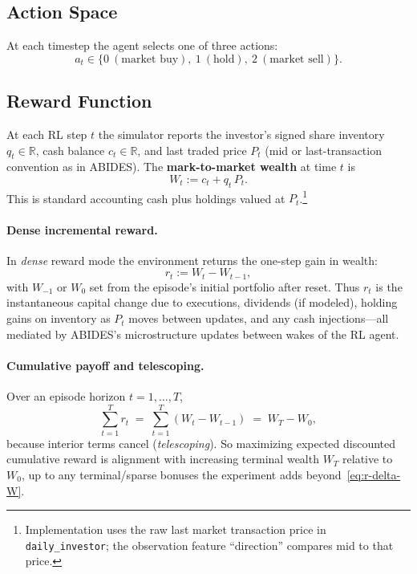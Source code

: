 \documentclass[11pt]{article}
\begin{document}
\subsection{Action Space}

At each timestep the agent selects one of three actions:
\[
a_t \in \{0\ (\text{market buy}),\ 1\ (\text{hold}),\ 2\ (\text{market sell})\}.
\]

\subsection{Reward Function}

At each RL step $t$ the simulator reports the investor's signed share inventory $q_t \in \mathbb{R}$, cash
balance $c_t \in \mathbb{R}$, and last traded price $P_t$ (mid or last-transaction convention as in ABIDES). The
\textbf{mark-to-market wealth} at time $t$ is
\begin{equation}
W_t := c_t + q_t\, P_t.
\label{eq:m2m}
\end{equation}
This is standard accounting cash plus holdings valued at $P_t$.\footnote{Implementation uses the raw last
market transaction price in \texttt{daily\_investor}; the observation feature ``direction'' compares mid to
that price.}

\paragraph{Dense incremental reward.}
In \emph{dense} reward mode the environment returns the one-step gain in wealth:
\begin{equation}
r_t := W_t - W_{t-1},
\label{eq:r-delta-W}
\end{equation}
with $W_{-1}$ or $W_0$ set from the episode's initial portfolio after reset. Thus $r_t$ is the instantaneous
capital change due to executions, dividends (if modeled), holding gains on inventory as $P_t$ moves between
updates, and any cash injections---all mediated by ABIDES's microstructure updates between wakes of the RL
agent.

\paragraph{Cumulative payoff and telescoping.}
Over an episode horizon $t = 1,\ldots,T$,
\begin{equation}
\sum_{t=1}^T r_t
\;=\;\sum_{t=1}^T (W_t - W_{t-1})
\;=\;W_T - W_0,
\label{eq:telescope}
\end{equation}
because interior terms cancel (\emph{telescoping}). So maximizing expected discounted cumulative reward is
alignment with increasing terminal wealth $W_T$ relative to $W_0$, up to any terminal/sparse bonuses the
experiment adds beyond~\eqref{eq:r-delta-W}.
\end{document}
